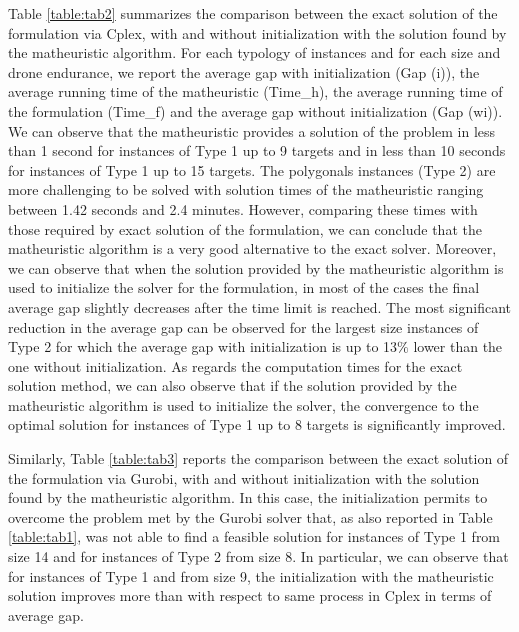\documentclass{itor}
\theoremstyle{definition}
\theoremstyle{remark}
\begin{document}
Table \ref{table:tab2} summarizes the comparison between the exact solution of the formulation via Cplex, with and without initialization with the solution found by the matheuristic algorithm. For each typology of instances and for each size and drone endurance, we report the average gap with initialization (Gap (i)), the average running time of the matheuristic (Time\_h), the average running time of the formulation (Time\_f) and the average gap without initialization (Gap (wi)). We can observe that the matheuristic  provides a solution of the problem in less than 1 second for instances of Type 1 up to 9 targets and in less than 10 seconds for instances of Type 1 up to 15 targets. The polygonals instances (Type 2) are more challenging to be solved with solution times of the matheuristic ranging between 1.42 seconds and 2.4 minutes. However, comparing these times with those required by exact solution of the formulation, we can conclude that the matheuristic algorithm is a very good alternative to the exact solver. Moreover, we can observe that when the solution provided by the matheuristic algorithm is used to initialize the solver for the formulation, in most of the cases the final average gap slightly decreases after the time limit is reached. The most significant reduction in the average gap can be observed for the largest size instances of Type 2 for which the average gap with initialization is up to 13$\%$ lower than the one without initialization. As regards the computation times for the exact solution method, we can also observe that if the solution provided by the matheuristic algorithm is used to initialize the solver, the convergence to the optimal solution for instances of Type 1 up to 8 targets is significantly improved.

Similarly, Table \ref{table:tab3} reports the comparison between the exact solution of the formulation via Gurobi, with and without initialization with the solution found by the matheuristic algorithm. In this case, the initialization permits to overcome the problem met by the Gurobi solver that, as also reported in Table \ref{table:tab1}, was not able to find a feasible solution for instances of Type 1 from size 14 and for instances of Type 2 from size 8. In particular, we can observe that for instances of Type 1 and from size 9, the initialization with the matheuristic solution improves more than with respect to same process in Cplex in terms of average gap.
\end{document}
